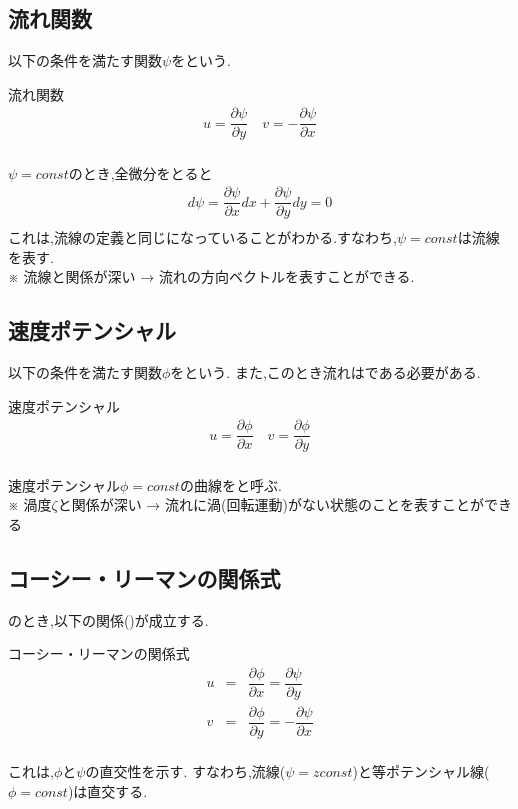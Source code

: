 \documentclass[a4paper]{jsarticle}
\begin{document}
\subsection{流れ関数}
以下の条件を満たす関数$\psi$をという.
\begin{itembox}[l]{流れ関数}
    \begin{eqnarray*}
        u=\dfrac{\partial \psi}{\partial y}\quad v=-\dfrac{\partial \psi}{\partial x}\\
    \end{eqnarray*}
\end{itembox}
$\psi =const$のとき,全微分をとると\\
\begin{eqnarray*}
    d\psi = \dfrac{\partial \psi}{\partial x}dx+\dfrac{\partial \psi}{\partial y}dy=0\\
\end{eqnarray*}
これは,流線の定義と同じになっていることがわかる.すなわち,$\psi = const$は流線を表す.\\
※ 流線と関係が深い → 流れの方向ベクトルを表すことができる.
\subsection{速度ポテンシャル}
以下の条件を満たす関数$\phi$をという.
また,このとき流れはである必要がある.
\begin{itembox}[l]{速度ポテンシャル}
    \begin{eqnarray*}
        u=\dfrac{\partial \phi}{\partial x}\quad v=\dfrac{\partial \phi}{\partial y}\\
    \end{eqnarray*}
\end{itembox}
速度ポテンシャル$\phi = const$の曲線をと呼ぶ.\\
※ 渦度$\zeta$と関係が深い → 流れに渦(回転運動)がない状態のことを表すことができる
\subsection{コーシー・リーマンの関係式}
のとき,以下の関係()が成立する.
\begin{itembox}[l]{コーシー・リーマンの関係式}
    \begin{eqnarray*}
        u&=&\dfrac{\partial \phi}{\partial x}=\dfrac{\partial \psi}{\partial y}\\
        v&=&\dfrac{\partial \phi}{\partial y}=-\dfrac{\partial \psi}{\partial x}\\
    \end{eqnarray*}
\end{itembox}
これは,$\phi$と$\psi$の直交性を示す.
すなわち,流線($\psi=zconst$)と等ポテンシャル線($\phi=const$)は直交する.
\end{document}
